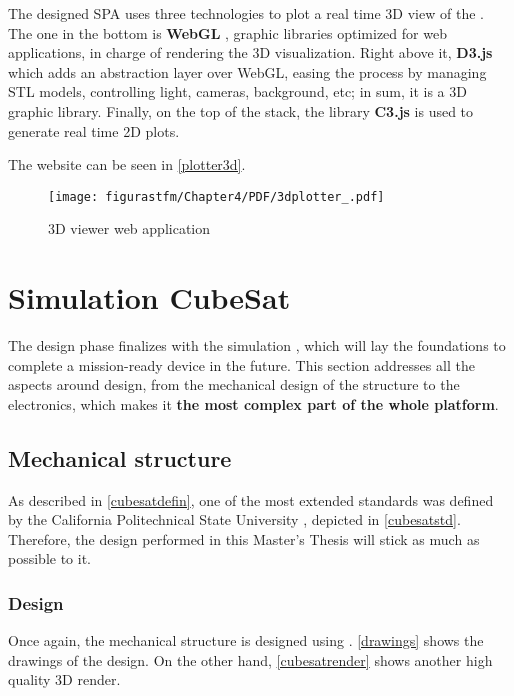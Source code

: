 The designed SPA uses three technologies to plot a real time 3D view of the . The one in the bottom is \textbf{WebGL} \cite{webgl}, graphic libraries optimized for web applications, in charge of rendering the 3D visualization. Right above it, \textbf{D3.js} \cite{d3} which adds an abstraction layer over WebGL, easing the process by managing \acrshort{STL} models, controlling light, cameras, background, etc; in sum, it is a 3D graphic library. Finally, on the top of the stack,  the library \textbf{C3.js} \cite{c3js} is used to generate real time 2D plots.

The website can be seen in \autoref{plotter3d}.

\begin{figure} [H]
			\centering
			\texttt{[image: figurastfm/Chapter4/PDF/3dplotter\_.pdf]}
			\caption{3D viewer web application} \label{plotter3d}
\end{figure}

\section{Simulation CubeSat}

The design phase finalizes with the simulation , which will lay the foundations to complete a mission-ready device in the future. This section addresses all the aspects around  design, from the mechanical design of the structure to the electronics, which makes it \textbf{the most complex part of the whole platform}.

\subsection{Mechanical structure}

As described in \autoref{cubesatdefin}, one of the most extended  standards was defined by the California Politechnical State University \cite{calpoly}, depicted in \autoref{cubesatstd}. Therefore, the design performed in this Master's Thesis will stick as much as possible to it.

\subsubsection{Design}

Once again, the mechanical structure is designed using . \autoref{drawings} shows the drawings of the design. On the other hand, \autoref{cubesatrender} shows another high quality 3D render.


